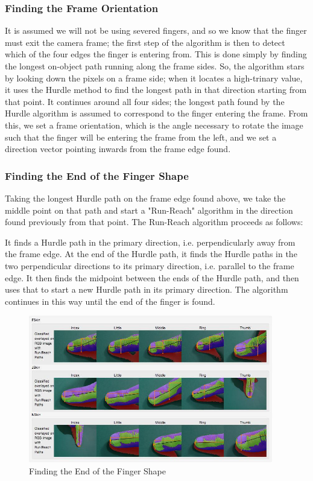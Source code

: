 \subsubsection{Finding the Frame Orientation}\label{sec:FindingTheFrameOrientation}
It is assumed we will not be using severed fingers, and so we know that the finger must exit the camera frame; the first step of the algorithm is then to detect which of the four edges the finger is entering from. This is done simply by finding the longest on-object path running along the frame sides. So, the algorithm stars by looking down the pixels on a frame side; when it locates a high-trinary value, it uses the Hurdle method to find the longest path in that direction starting from that point. It continues around all four sides; the longest path found by the Hurdle algorithm is assumed to correspond to the finger entering the frame. From this, we set a frame orientation, which is the angle necessary to rotate the image such that the finger will be entering the frame from the left, and we set a direction vector pointing inwards from the frame edge found.

\subsubsection{Finding the End of the Finger Shape}\label{sec:FindingTheEndOfTheFingerShape}
Taking the longest Hurdle path on the frame edge found above, we take the middle point on that path and start a "Run-Reach" algorithm in the direction found previously from that point. The Run-Reach algorithm proceeds as follows:

It finds a Hurdle path in the primary direction, i.e. perpendicularly away from the frame edge. At the end of the Hurdle path, it finds the Hurdle paths in the two perpendicular directions to its primary direction, i.e. parallel to the frame edge. It then finds the midpoint between the ends of the Hurdle path, and then uses that to start a new Hurdle path in its primary direction. The algorithm continues in this way until the end of the finger is found.

\begin{figure}[h!]
  \centering
    \includegraphics[width=0.95\textwidth]{Chapter4/Figs/FindingTheTip.jpg}
    \caption{Finding the End of the Finger Shape}\label{fig:FindingTheTip}
\end{figure}



